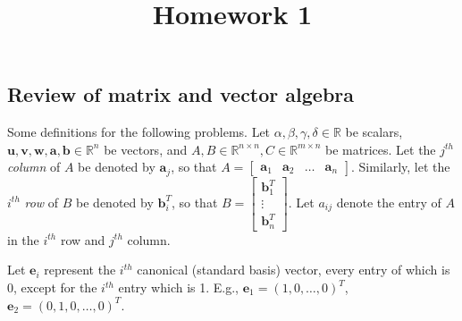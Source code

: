\documentclass{article}
\title{Homework 1}
\date{}
\renewcommand{\vec}[1]{\mathbf{#1}}
\newcommand{\mx}[1]{\begin{bmatrix} #1 \end{bmatrix}}
\begin{document}
\maketitle{}


\subsection*{Review of matrix and vector algebra}

Some definitions for the following problems.  Let $\alpha, \beta, \gamma, \delta \in \mathbb{R}$ be scalars, $ \vec{u}, \vec{v}, \vec{w},\vec{a}, \vec{b} \in \mathbb{R}^{n}$ be vectors, and  $A, B \in \mathbb{R}^{n \times n}, C \in \mathbb{R}^{m \times n}$ be matrices.  Let the $j^{th}$ \emph{column} of $A$ be denoted by $\vec{a}_j$, so that $A  = \mx { \vec{a}_1 & \vec{a}_2 & \ldots & \vec{a}_n} $.
Similarly, let the $i^{th}$ \emph{row} of $B$ be denoted by $\vec{b}_i^T$, so that $B = \mx { \vec{b}_1^T \\ \vdots \\ \vec{b}_n^T}$.  Let $a_{ij}$ denote the entry of $A$ in the $i^{th}$ row and $j^{th}$ column.

Let $\vec{e}_i$ represent the $i^{th}$ canonical (standard basis) vector, every entry of which is 0, except for the $i^{th}$ entry which is 1.  E.g., $\vec{e}_1 = (1, 0, \ldots, 0)^T$, $\vec{e}_2 = (0, 1, 0, \ldots, 0)^T$.
\end{document}
